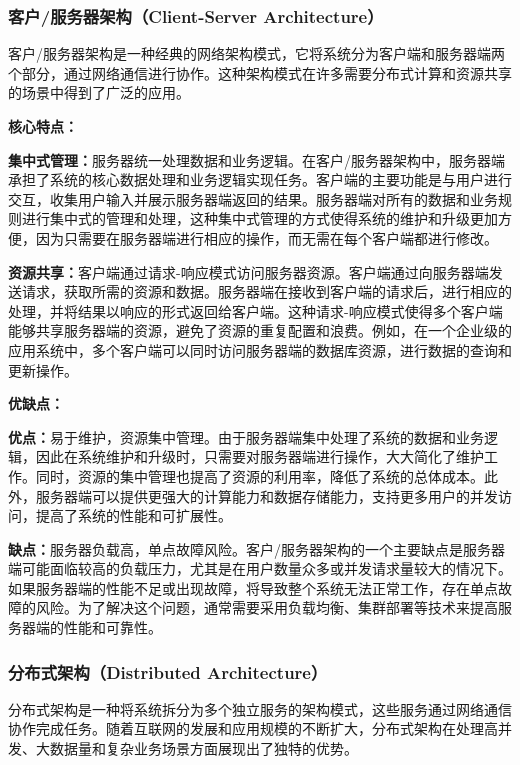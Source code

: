 \subsubsection{客户/服务器架构（Client-Server Architecture）}

客户/服务器架构是一种经典的网络架构模式，它将系统分为客户端和服务器端两个部分，通过网络通信进行协作。这种架构模式在许多需要分布式计算和资源共享的场景中得到了广泛的应用。

\textbf{核心特点：}

\textbf{集中式管理：}服务器统一处理数据和业务逻辑。在客户/服务器架构中，服务器端承担了系统的核心数据处理和业务逻辑实现任务。客户端的主要功能是与用户进行交互，收集用户输入并展示服务器端返回的结果。服务器端对所有的数据和业务规则进行集中式的管理和处理，这种集中式管理的方式使得系统的维护和升级更加方便，因为只需要在服务器端进行相应的操作，而无需在每个客户端都进行修改。

\textbf{资源共享：}客户端通过请求-响应模式访问服务器资源。客户端通过向服务器端发送请求，获取所需的资源和数据。服务器端在接收到客户端的请求后，进行相应的处理，并将结果以响应的形式返回给客户端。这种请求-响应模式使得多个客户端能够共享服务器端的资源，避免了资源的重复配置和浪费。例如，在一个企业级的应用系统中，多个客户端可以同时访问服务器端的数据库资源，进行数据的查询和更新操作。

\textbf{优缺点：}

\textbf{优点：}易于维护，资源集中管理。由于服务器端集中处理了系统的数据和业务逻辑，因此在系统维护和升级时，只需要对服务器端进行操作，大大简化了维护工作。同时，资源的集中管理也提高了资源的利用率，降低了系统的总体成本。此外，服务器端可以提供更强大的计算能力和数据存储能力，支持更多用户的并发访问，提高了系统的性能和可扩展性。

\textbf{缺点：}服务器负载高，单点故障风险。客户/服务器架构的一个主要缺点是服务器端可能面临较高的负载压力，尤其是在用户数量众多或并发请求量较大的情况下。如果服务器端的性能不足或出现故障，将导致整个系统无法正常工作，存在单点故障的风险。为了解决这个问题，通常需要采用负载均衡、集群部署等技术来提高服务器端的性能和可靠性。

\subsubsection{分布式架构（Distributed Architecture）}

分布式架构是一种将系统拆分为多个独立服务的架构模式，这些服务通过网络通信协作完成任务。随着互联网的发展和应用规模的不断扩大，分布式架构在处理高并发、大数据量和复杂业务场景方面展现出了独特的优势。

